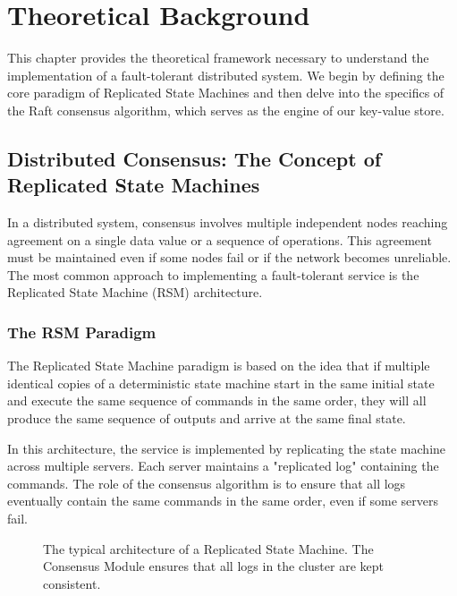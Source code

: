 \chapter{Theoretical Background}
\label{ch:theoretical_background}

This chapter provides the theoretical framework necessary to understand the implementation of a fault-tolerant distributed system. We begin by defining the core paradigm of Replicated State Machines and then delve into the specifics of the Raft consensus algorithm, which serves as the engine of our key-value store.

\section{Distributed Consensus: The Concept of Replicated State Machines}
In a distributed system, consensus involves multiple independent nodes reaching agreement on a single data value or a sequence of operations. This agreement must be maintained even if some nodes fail or if the network becomes unreliable. The most common approach to implementing a fault-tolerant service is the Replicated State Machine (RSM) architecture.

\subsection{The RSM Paradigm}
The Replicated State Machine paradigm \cite{Schneider1990} is based on the idea that if multiple identical copies of a deterministic state machine start in the same initial state and execute the same sequence of commands in the same order, they will all produce the same sequence of outputs and arrive at the same final state. 

In this architecture, the service is implemented by replicating the state machine across multiple servers. Each server maintains a "replicated log" containing the commands. The role of the consensus algorithm is to ensure that all logs eventually contain the same commands in the same order, even if some servers fail.

\begin{figure}[h]
    \centering
    \caption{The typical architecture of a Replicated State Machine. The Consensus Module ensures that all logs in the cluster are kept consistent.}
    \label{fig:rsm_architecture}
\end{figure}

